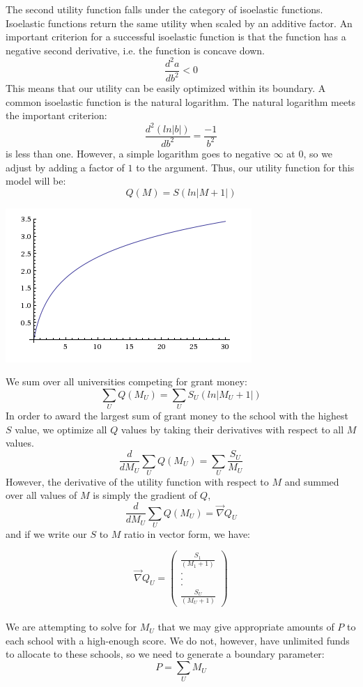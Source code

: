 \documentclass[paper.tex]{subfiles}
\begin{document}
	The second utility function falls under the category of isoelastic functions. Isoelastic functions return the same utility when scaled by an additive factor. \cite{norstad1999introduction}
	An important criterion for a successful isoelastic function is that the function has a negative second derivative, i.e. the function is concave down.  \[\frac{d^2a}{db^2} < 0\] 
	This means that our utility can be easily optimized within its boundary. A common isoelastic function is the natural logarithm. The natural logarithm meets the important criterion: \[\frac{d^2(ln|b|)}{db^2} = \frac{-1}{b^2}\]  is less than one. However, a simple logarithm goes to negative $\infty$ at $0$, so we adjust by adding a factor of $1$ to the argument. Thus, our utility function for this model will be:
	$$ Q(M) = S(ln|M+1|) $$
\begin{center}
	\includegraphics[width=0.5\linewidth]{images/UF2}
\end{center}
	
	We sum over all universities competing for grant money:
	$$ \sum_{U} Q(M_{U})  = \sum_{U} S_{U}(ln|M_{U}+1|)  $$
	In order to award the largest sum of grant money to the school with the highest $S$ value, we optimize all $Q$ values by taking their derivatives with respect to all $M$ values.
	$$ \frac{d}{dM_{U}} \sum_{U}Q(M_{U})  = \sum_{U}\frac{S_{U}}{M_{U}} $$
	However, the derivative of the utility function with respect to $M$ and summed over all values of $M$ is simply the gradient of $Q$,
	$$ \frac{d}{dM_{U}} \sum_{U}Q(M_{U}) = \vec{\nabla} Q_{U}   $$
	and if we write our $S$ to $M$ ratio in vector form, we have:
	 
	$$ \vec{\nabla} Q_{U} =  \left( \begin{array}{c}
	\frac{S_{1}}{(M_{1}+1)} \\
	. \\
	.\\
	.\\
	\frac{S_{U}}{(M_{U}+1)}  \end{array} \right) $$
	\\
	
	We are attempting to solve for $M_{U}$ that we may give appropriate amounts of $P$ to each school with a high-enough score. We do not, however, have unlimited funds to allocate to these schools, so we need to generate a boundary parameter:
	$$ P = \sum_{U} M_{U}   $$
	
\end{document}
